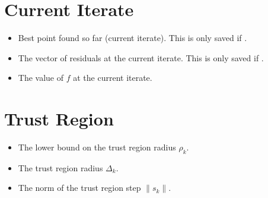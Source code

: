 \documentclass[letterpaper,10pt,english]{sphinxmanual}
\begin{document}
\section{Current Iterate}
\label{\detokenize{diagnostic:current-iterate}}\begin{itemize}
\item {} 
\sphinxAtStartPar
{} \sphinxhyphen{} Best point found so far (current iterate). This is only saved if .

\item {} 
\sphinxAtStartPar
{} \sphinxhyphen{} The vector of residuals at the current iterate. This is only saved if .

\item {} 
\sphinxAtStartPar
{} \sphinxhyphen{} The value of \(f\) at the current iterate.

\end{itemize}


\section{Trust Region}
\label{\detokenize{diagnostic:trust-region}}\begin{itemize}
\item {} 
\sphinxAtStartPar
{} \sphinxhyphen{} The lower bound on the trust region radius \(\rho_k\).

\item {} 
\sphinxAtStartPar
{} \sphinxhyphen{} The trust region radius \(\Delta_k\).

\item {} 
\sphinxAtStartPar
{} \sphinxhyphen{} The norm of the trust region step \(\|s_k\|\).

\end{itemize}
\end{document}
